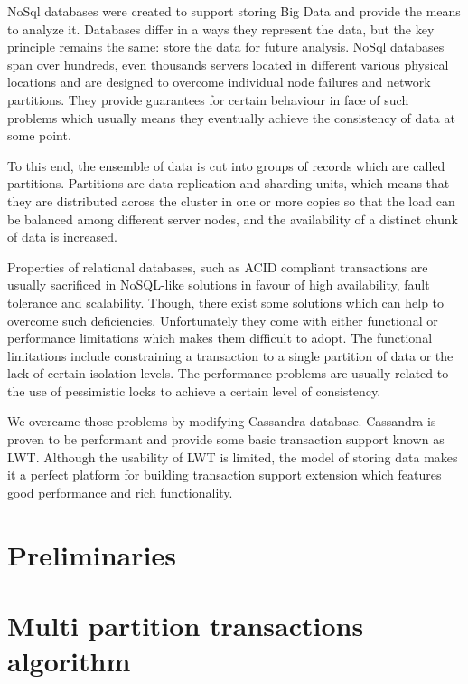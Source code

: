 \documentclass[runningheads,a4paper]{llncs}
\begin{document}
NoSql databases were created to support storing Big Data and provide the means to analyze it. 
Databases differ in a ways they represent the data, but the key principle remains the same: 
store the data for future analysis. NoSql databases span over hundreds, even thousands servers 
located in different various physical locations and are designed to overcome individual node 
failures and network partitions. They provide guarantees for certain behaviour in face of such
problems which usually means they eventually achieve the consistency of data at some point.

To this end, the ensemble of data is cut into groups of records which are called partitions. 
Partitions are data replication and sharding units, which means that they are distributed across 
the cluster in one or more copies so that the load can be balanced among different server nodes,
and the availability of a distinct chunk of data is increased.

Properties of relational databases, such as ACID compliant transactions are usually sacrificed in
NoSQL-like solutions in favour of high availability, fault tolerance and scalability. Though, 
there exist some solutions which can help to overcome such deficiencies. Unfortunately they come
with either functional or performance limitations which makes them difficult to adopt. 
The functional limitations include constraining a transaction to a single partition of data
or the lack of certain isolation levels. The performance problems are usually related to the 
use of pessimistic locks to achieve a certain level of consistency.

We overcame those problems by modifying Cassandra database. Cassandra is proven to be performant 
and provide some basic transaction support known as LWT. Although the usability of LWT is limited,
the model of storing data makes it a perfect platform for building transaction support extension
which features good performance and rich functionality.


\section{Preliminaries}





\section{Multi partition transactions algorithm}
\end{document}
